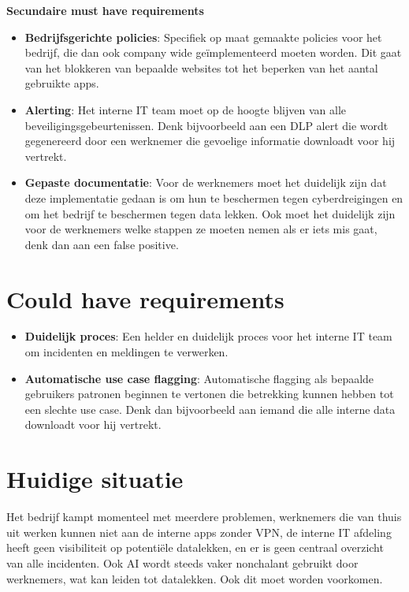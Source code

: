 \textbf{Secundaire must have requirements}
\begin{itemize}
  \item \textbf{Bedrijfsgerichte policies}: Specifiek op maat gemaakte policies voor het bedrijf, die dan ook company wide geïmplementeerd moeten worden. Dit gaat van het blokkeren van bepaalde websites tot het beperken van het aantal gebruikte apps.
  \item \textbf{Alerting}: Het interne IT team moet op de hoogte blijven van alle beveiligingsgebeurtenissen. Denk bijvoorbeeld aan een DLP alert die wordt gegenereerd door een werknemer die gevoelige informatie downloadt voor hij vertrekt.
  \item \textbf{Gepaste documentatie}: Voor de werknemers moet het duidelijk zijn dat deze implementatie gedaan is om hun te beschermen tegen cyberdreigingen en om het bedrijf te beschermen tegen data lekken. Ook moet het duidelijk zijn voor de werknemers welke stappen ze moeten nemen als er iets mis gaat, denk dan aan een false positive.
\end{itemize}

\section{Could have requirements}
\begin{itemize}
  \item \textbf{Duidelijk proces}: Een helder en duidelijk proces voor het interne IT team om incidenten en meldingen te verwerken. 
  \item \textbf{Automatische use case flagging}: Automatische flagging als bepaalde gebruikers patronen beginnen te vertonen die betrekking kunnen hebben tot een slechte use case. Denk dan bijvoorbeeld aan iemand die alle interne data downloadt voor hij vertrekt.
\end{itemize}

\section{Huidige situatie}
Het bedrijf kampt momenteel met meerdere problemen, werknemers die van thuis uit werken kunnen niet aan de interne apps zonder VPN, de interne IT afdeling heeft geen visibiliteit op potentiële datalekken, en er is geen centraal overzicht van alle incidenten. Ook AI wordt steeds vaker nonchalant gebruikt door werknemers, wat kan leiden tot datalekken. Ook dit moet worden voorkomen.